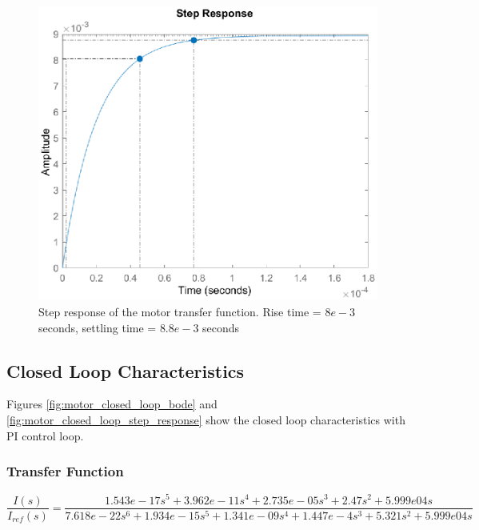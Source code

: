 \documentclass{report}
\begin{document}
\begin{figure}[h]
\centering
\includegraphics[scale=0.6]{motor_plant_step_response}	
\caption{Step response of the motor transfer function. Rise time = $8e-3$ seconds, settling time = $8.8e-3$ seconds}
\label{fig:motor_plant_step_response}
\end{figure}

\subsection{Closed Loop Characteristics}
Figures \ref{fig:motor_closed_loop_bode} and \ref{fig:motor_closed_loop_step_response} show the closed loop characteristics with PI control loop.
\subsubsection{Transfer Function}
\begin{equation}
\frac{I(s)}{I_{ref}(s)} = \frac{1.543e-17 s^5 + 3.962e-11 s^4 + 2.735e-05 s^3 + 2.47 s^2 + 5.999e04 s}{7.618e-22 s^6 + 1.934e-15 s^5 + 1.341e-09 s^4 + 1.447e-4 s^3 + 5.321 s^2 + 5.999e04 s}
\end{equation}
\end{document}
